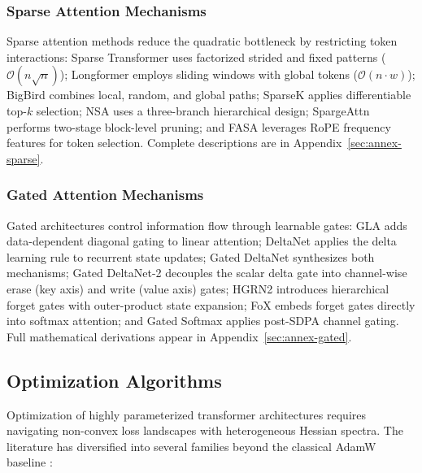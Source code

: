 \subsubsection{Sparse Attention Mechanisms}
Sparse attention methods reduce the quadratic bottleneck by restricting token interactions: Sparse Transformer \citep{child_sparse_transformer_2019} uses factorized strided and fixed patterns ($\mathcal{O}(n\sqrt{n})$); Longformer \citep{beltagy_longformer_2020} employs sliding windows with global tokens ($\mathcal{O}(n \cdot w)$); BigBird \citep{zaheer_bigbird_2020} combines local, random, and global paths; SparseK \citep{lou_sparsek_2024} applies differentiable top-$k$ selection; NSA \citep{yuan_nsa_2025} uses a three-branch hierarchical design; SpargeAttn \citep{zhang_spargeattn_2025} performs two-stage block-level pruning; and FASA \citep{wang_fasa_2026} leverages RoPE frequency features for token selection. Complete descriptions are in Appendix~\ref{sec:annex-sparse}.

\subsubsection{Gated Attention Mechanisms}
Gated architectures control information flow through learnable gates: GLA \citep{yang_gla_2023} adds data-dependent diagonal gating to linear attention; DeltaNet \citep{yang_deltanet_2024} applies the delta learning rule to recurrent state updates; Gated DeltaNet \citep{yang_gated_deltanet_2024} synthesizes both mechanisms; Gated DeltaNet-2 \citep{hatamizadeh_gated_deltanet2_2026} decouples the scalar delta gate into channel-wise erase (key axis) and write (value axis) gates; HGRN2 \citep{qin_hgrn2_2024} introduces hierarchical forget gates with outer-product state expansion; FoX \citep{lin_forgetting_transformer_2025} embeds forget gates directly into softmax attention; and Gated Softmax \citep{qiu_gated_attention_2025} applies post-SDPA channel gating. Full mathematical derivations appear in Appendix~\ref{sec:annex-gated}.

\subsection{Optimization Algorithms}

Optimization of highly parameterized transformer architectures requires navigating non-convex loss landscapes with heterogeneous Hessian spectra. The literature has diversified into several families beyond the classical AdamW baseline \citep{loshchilov_decoupled_2017}:

